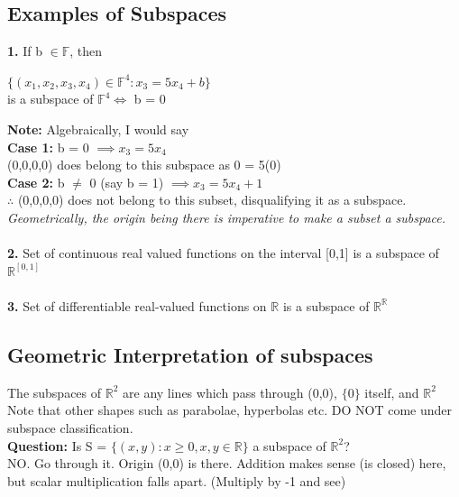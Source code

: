 \documentclass{article}
\begin{document}
\subsection{Examples of Subspaces}
\textbf{1.} If b $\in \mathbb{F}$, then 
\begin{center}
    $\{(x_1, x_2,x_3,x_4) \in \mathbb{F}^4 : x_3 = 5x_4 + b\}$ \\
    is a subspace of $\mathbb{F}^4 \iff$ b = 0
\end{center}
\textbf{Note:} Algebraically, I would say \\
\textbf{Case 1:} b = 0 $\implies x_3 = 5x_4$ \\
(0,0,0,0) does belong to this subspace as 0 = 5(0) \\
\textbf{Case 2:} b $\neq$ 0 (say b = 1) $\implies x_3 = 5x_4 +1$  \\
$\therefore$ (0,0,0,0) does not belong to this subset, disqualifying it as a subspace. \\ 
\textit{Geometrically, the origin being there is imperative to make a subset a subspace.} \\
\\
\textbf{2.} Set of continuous real valued functions on the interval [0,1] is a subspace of $\mathbb{R}^{[0,1]}$ \\
\\
\textbf{3.} Set of differentiable real-valued functions on $\mathbb{R}$ is a subspace of $\mathbb{R}^{\mathbb{R}}$
\subsection{Geometric Interpretation of subspaces}
The subspaces of $\mathbb{R}^2$ are any lines which pass through (0,0), $\{0\}$ itself, and $\mathbb{R}^2$ \\
Note that other shapes such as parabolae, hyperbolas etc. DO NOT come under subspace classification. \\

\textbf{Question:} Is S = $\{(x,y): x \ge 0, x,y \in \mathbb{R}\}$ a subspace of $\mathbb{R}^2$? \\
NO. Go through it. Origin (0,0) is there. Addition makes sense (is closed) here, but scalar multiplication falls apart. (Multiply by -1 and see) 
\end{document}
